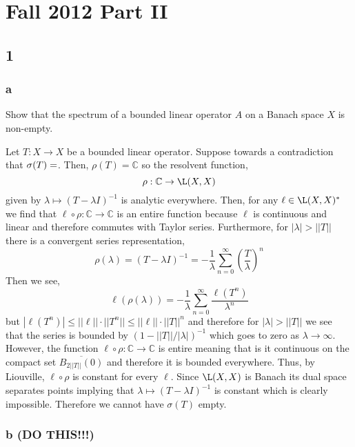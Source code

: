 \documentclass[12pt]{article}
\renewcommand{\C}{\mathbb{C}}
\begin{document}
\section{Fall 2012 Part II}

\subsection{1}

\subsubsection{a}

\begin{exercise}
Show that the spectrum of a bounded linear operator $A$ on a Banach space $X$ is non-empty.
\end{exercise}

Let $T : X \to X$ be a bounded linear operator. Suppose towards a contradiction that $\sigma(T) = \empty$. Then, $\rho(T) = \C$ so the resolvent function, 
\[ \rho : \C \to \L(X, X) \]
given by $\lambda \mapsto (T - \lambda I)^{-1}$ is analytic everywhere. Then, for any $\ell \in \L(X, X)^*$ we find that $\ell \circ \rho : \C \to \C$ is an entire function because $\ell$ is continuous and linear and therefore commutes with Taylor series. Furthermore, for $| \lambda | > || T ||$ there is a convergent series representation,
\[ \rho(\lambda) = (T - \lambda I)^{-1} = - \frac{1}{\lambda} \sum_{n = 0}^\infty \left( \frac{T}{\lambda} \right)^n \]
Then we see,
\[ \ell(\rho(\lambda)) = - \frac{1}{\lambda} \sum_{n = 0}^\infty \frac{\ell(T^n)}{\lambda^n} \]
but $| \ell(T^n) | \le || \ell || \cdot || T^n || \le || \ell || \cdot || T ||^n$ and therefore for $| \lambda | > || T ||$ we see that the series is bounded by $(1 - || T || / | \lambda |)^{-1}$ which goes to zero as $\lambda \to \infty$. However, the function $\ell \circ \rho : \C \to \C$ is entire meaning that is it continuous on the compact set $\overline{B_{2 || T ||}(0)}$ and therefore it is bounded everywhere. Thus, by Liouville, $\ell \circ \rho$ is constant for every $\ell$. Since $\L(X, X)$ is Banach its dual space separates points implying that $\lambda \mapsto (T - \lambda I)^{-1}$ is constant which is clearly impossible. Therefore we cannot have $\sigma(T)$ empty.

\subsubsection{b (DO THIS!!!)}
\end{document}
